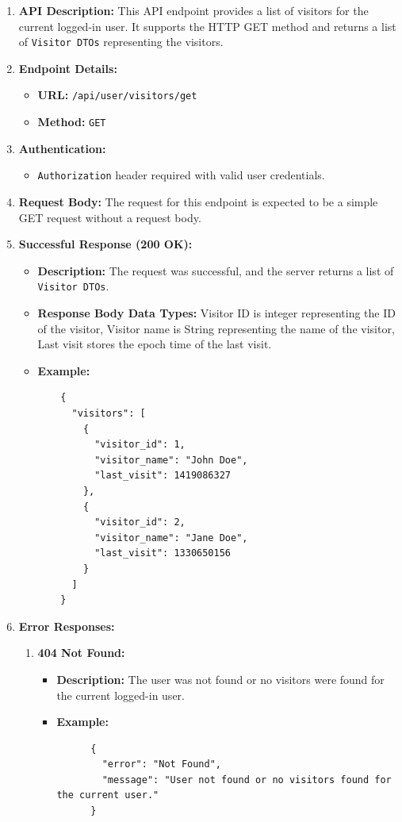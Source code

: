 \documentclass[a4 paper, 12pt]{article}
\begin{document}
\begin{enumerate}
  \item \textbf{API Description:} This API endpoint provides a list of visitors for the current logged-in user. It supports the HTTP GET method and returns a list of \texttt{Visitor DTOs} representing the visitors.

  \item \textbf{Endpoint Details:}
  \begin{itemize}
    \item \textbf{URL:} \texttt{/api/user/visitors/get}
    \item \textbf{Method:} \texttt{GET}
  \end{itemize}
  \item \textbf{Authentication:}
  \begin{itemize}
    \item \texttt{Authorization} header required with valid user credentials.
  \end{itemize}
  \item \textbf{Request Body:} The request for this endpoint is expected to be a simple GET request without a request body.

  \item \textbf{Successful Response (200 OK):}
  \begin{itemize}
    \item \textbf{Description:} The request was successful, and the server returns a list of \texttt{Visitor DTOs}.
    \item \textbf{Response Body Data Types:} Visitor ID is integer representing the ID of the visitor, Visitor name is String representing the name of the visitor, Last visit stores the epoch time of the last visit.
    \item \textbf{Example:}
    \begin{verbatim}
    {
      "visitors": [
        {
          "visitor_id": 1,
          "visitor_name": "John Doe",
          "last_visit": 1419086327
        },
        {
          "visitor_id": 2,
          "visitor_name": "Jane Doe",
          "last_visit": 1330650156
        }
      ]
    }
    \end{verbatim}
  \end{itemize}

  \item \textbf{Error Responses:}
  \begin{enumerate}
    \item \textbf{404 Not Found:}
    \begin{itemize}
      \item \textbf{Description:} The user was not found or no visitors were found for the current logged-in user.
      \item \textbf{Example:}
      \begin{verbatim}
      {
        "error": "Not Found",
        "message": "User not found or no visitors found for the current user."
      }
      \end{verbatim}
    \end{itemize}


\end{enumerate}
\end{enumerate}
\end{document}
